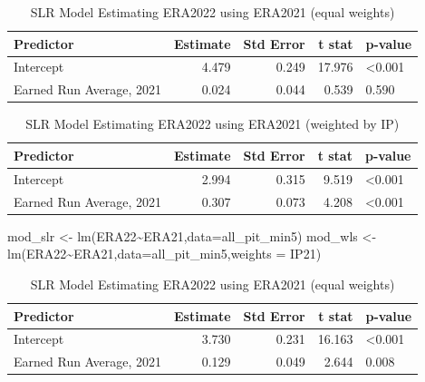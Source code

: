 \documentclass[
  11pt,
]{book}
\newenvironment{Shaded}{\begin{snugshade}}{\end{snugshade}}
\newcommand{\AttributeTok}[1]{\textcolor[rgb]{0.77,0.63,0.00}{#1}}
\newcommand{\FunctionTok}[1]{\textcolor[rgb]{0.00,0.00,0.00}{#1}}
\newcommand{\NormalTok}[1]{#1}
\newcommand{\OtherTok}[1]{\textcolor[rgb]{0.56,0.35,0.01}{#1}}
\newcommand{\SpecialCharTok}[1]{\textcolor[rgb]{0.00,0.00,0.00}{#1}}
\theoremstyle{definition}
\theoremstyle{definition}
\theoremstyle{definition}
\theoremstyle{definition}
\theoremstyle{remark}
\begin{document}
\begin{table}[!h]

\caption{\label{tab:unnamed-chunk-271}SLR Model Estimating ERA2022 using ERA2021 (equal weights)}
\centering
\begin{tabular}[t]{lrrrl}
\toprule
Predictor & Estimate & Std Error & t stat & p-value\\
\midrule
Intercept & 4.479 & 0.249 & 17.976 & <0.001\\
Earned Run Average, 2021 & 0.024 & 0.044 & 0.539 & 0.590\\
\bottomrule
\end{tabular}
\end{table}

\begin{table}[!h]

\caption{\label{tab:unnamed-chunk-272}SLR Model Estimating ERA2022 using ERA2021 (weighted by IP)}
\centering
\begin{tabular}[t]{lrrrl}
\toprule
Predictor & Estimate & Std Error & t stat & p-value\\
\midrule
Intercept & 2.994 & 0.315 & 9.519 & <0.001\\
Earned Run Average, 2021 & 0.307 & 0.073 & 4.208 & <0.001\\
\bottomrule
\end{tabular}
\end{table}

\begin{Shaded}
\begin{Highlighting}[]
\NormalTok{mod\_slr }\OtherTok{\textless{}{-}} \FunctionTok{lm}\NormalTok{(ERA22}\SpecialCharTok{\textasciitilde{}}\NormalTok{ERA21,}\AttributeTok{data=}\NormalTok{all\_pit\_min5)}
\NormalTok{mod\_wls }\OtherTok{\textless{}{-}} \FunctionTok{lm}\NormalTok{(ERA22}\SpecialCharTok{\textasciitilde{}}\NormalTok{ERA21,}\AttributeTok{data=}\NormalTok{all\_pit\_min5,}\AttributeTok{weights =}\NormalTok{ IP21)}
\end{Highlighting}
\end{Shaded}

\begin{table}[!h]

\caption{\label{tab:unnamed-chunk-274}SLR Model Estimating ERA2022 using ERA2021 (equal weights)}
\centering
\begin{tabular}[t]{lrrrl}
\toprule
Predictor & Estimate & Std Error & t stat & p-value\\
\midrule
Intercept & 3.730 & 0.231 & 16.163 & <0.001\\
Earned Run Average, 2021 & 0.129 & 0.049 & 2.644 & 0.008\\
\bottomrule
\end{tabular}
\end{table}
\end{document}
